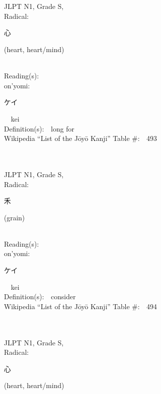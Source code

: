 \begin{multicols}{2}
\ \ \\
{\fontsize{34pt}{40pt}  }\ \ \\
{JLPT N1, Grade S, \\Radical:\ \ {\begin{CJK}{UTF8}{min} 心 \end{CJK}} (heart, heart/mind) } \\
Reading(s):\ \ \\
{\hspace*{1em}}on'yomi:\ \ \\
{\hspace*{2em}}{\begin{CJK}{UTF8}{min} ケイ \end{CJK}}\ \ kei\ \ \\
Definition(s):\ \ long for \\
Wikipedia ``List of the J\=oy\=o Kanji'' Table \#:\ \ 493 \\
\ \ \\
{\fontsize{34pt}{40pt}  }\ \ \\
{JLPT N1, Grade S, \\Radical:\ \ {\begin{CJK}{UTF8}{min} 禾 \end{CJK}} (grain) } \\
Reading(s):\ \ \\
{\hspace*{1em}}on'yomi:\ \ \\
{\hspace*{2em}}{\begin{CJK}{UTF8}{min} ケイ \end{CJK}}\ \ kei\ \ \\
Definition(s):\ \ consider \\
Wikipedia ``List of the J\=oy\=o Kanji'' Table \#:\ \ 494 \\
\ \ \\
{\fontsize{34pt}{40pt}  }\ \ \\
{JLPT N1, Grade S, \\Radical:\ \ {\begin{CJK}{UTF8}{min} 心 \end{CJK}} (heart, heart/mind) } \\

\end{multicols}
